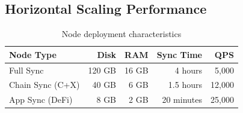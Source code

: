 \subsection{Horizontal Scaling Performance}

\begin{table}[h]
\centering
\begin{tabular}{@{}lrrrr@{}}
\toprule
\textbf{Node Type} & \textbf{Disk} & \textbf{RAM} & \textbf{Sync Time} & \textbf{QPS} \\ \midrule
Full Sync & 120 GB & 16 GB & 4 hours & 5,000 \\
Chain Sync (C+X) & 40 GB & 6 GB & 1.5 hours & 12,000 \\
App Sync (DeFi) & 8 GB & 2 GB & 20 minutes & 25,000 \\ \bottomrule
\end{tabular}
\caption{Node deployment characteristics}
\end{table}

